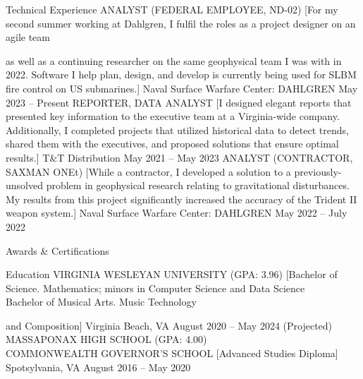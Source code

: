 \documentclass{llresume}
\renewcommand{\emph}[1]{{\bfseries\color{accentcolor}#1}}
\begin{document}
\makeheader

\begin{mainpane}
    \begin{mainsection}{Technical Experience}
        \entryJob
            {ANALYST (FEDERAL EMPLOYEE, ND-02)}
            [For my second summer working at Dahlgren, I fulfil the roles as a project designer on an agile team \par as well as a continuing researcher on the same geophysical team I was with in 2022. Software I help plan, design, and develop is currently being used for SLBM fire control on US submarines.]
            {Naval Surface Warfare Center: DAHLGREN}
            {May 2023 -- Present}
        \entryJob
            {REPORTER, DATA ANALYST}
            [I designed elegant reports that presented key information to the executive team at a Virginia-wide company. Additionally, I completed projects that utilized historical data to detect trends, shared them with the executives, and proposed solutions that ensure optimal results.]
            {T\&T Distribution}
            {May 2021 -- May 2023}
        \entryJob
            {ANALYST (CONTRACTOR, SAXMAN ONEt)}
            [While a contractor, I developed a solution to a previously-unsolved problem in geophysical research relating to gravitational disturbances. My results from this project significantly increased the accuracy of the Trident II weapon system.]
            {Naval Surface Warfare Center: DAHLGREN}
            {May 2022 -- July 2022}
    \end{mainsection}

    \begin{mainsection}{Awards \& Certifications}
    \end{mainsection}

   
    
    \begin{mainsection}{Education}
        \entryJob
            {VIRGINIA WESLEYAN UNIVERSITY (GPA: 3.96)}
            [Bachelor of Science. Mathematics; minors in Computer Science and Data Science \\
            \vspace{1mm} Bachelor of Musical Arts. Music Technology \par and Composition]
            {Virginia Beach, VA}
            {August 2020 -- May 2024 (Projected)}
        \entryJob
            {MASSAPONAX HIGH SCHOOL (GPA: 4.00) \\ COMMONWEALTH GOVERNOR'S SCHOOL}
            [Advanced Studies Diploma]
            {Spotsylvania, VA}
            {August 2016 -- May 2020}
    \end{mainsection}


\end{mainpane}
\end{document}
